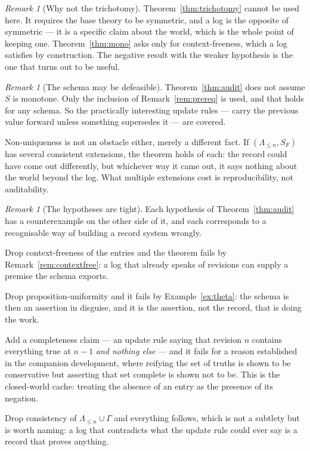 \documentclass[11pt]{article}
\theoremstyle{plain}
\theoremstyle{definition}
\theoremstyle{remark}
\newtheorem{remark}[theorem]{Remark}
\begin{document}
\begin{remark}[Why not the trichotomy]
Theorem~\ref{thm:trichotomy} cannot be used here. It requires the base theory
to be symmetric, and a log is the opposite of symmetric --- it is a specific
claim about the world, which is the whole point of keeping one.
Theorem~\ref{thm:mono} asks only for context-freeness, which a log satisfies by
construction. The negative result with the weaker hypothesis is the one that
turns out to be useful.
\end{remark}

\begin{remark}[The schema may be defeasible]
Theorem~\ref{thm:audit} does not assume $S$ is monotone. Only the inclusion of
Remark~\ref{rem:prereq} is used, and that holds for any schema. So the
practically interesting update rules --- carry the previous value forward unless
something supersedes it --- are covered.

Non-uniqueness is not an obstacle either, merely a different fact. If
$(\Lambda_{\le n},S_F)$ has several consistent extensions, the theorem holds of
each: the record could have come out differently, but whichever way it came out,
it says nothing about the world beyond the log. What multiple extensions cost
is reproducibility, not auditability.
\end{remark}

\begin{remark}[The hypotheses are tight]\label{rem:tight}
Each hypothesis of Theorem~\ref{thm:audit} has a counterexample on the other
side of it, and each corresponds to a recognisable way of building a record
system wrongly.

Drop context-freeness of the entries and the theorem fails by
Remark~\ref{rem:contextfree}: a log that already speaks of revisions can supply
a premise the schema exports.

Drop proposition-uniformity and it fails by Example~\ref{ex:theta}: the schema
is then an assertion in disguise, and it is the assertion, not the record, that
is doing the work.

Add a completeness claim --- an update rule saying that revision $n$ contains
everything true at $n-1$ \emph{and nothing else} --- and it fails for a reason
established in the companion development, where reifying the set of truths is
shown to be conservative but asserting that set complete is shown not to be.
This is the closed-world cache: treating the absence of an entry as the presence
of its negation.

Drop consistency of $\Lambda_{\le n}\cup\Gamma$ and everything follows, which is
not a subtlety but is worth naming: a log that contradicts what the update rule
could ever say is a record that proves anything.
\end{remark}
\end{document}
